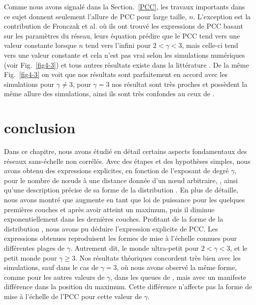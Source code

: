 Comme nous avons signalé dans la Section.~\ref{PCC}, les travaux importants \cite{Do-al2003,Cohen-Havlin2003} dans ce sujet donnent seulement l'allure de PCC pour large taille, $n$. L'exception est la contribution de Fronczak et  al. \cite{Fronczak-al2004} où ils ont trouvé les expressions de PCC basant sur les paramètres du réseau, leurs équation prédire que le PCC tend vers une valeur constante lorsque $n$ tend vers l'infini pour $2<\gamma<3$, mais celle-ci tend vers une valeur constante et cela n’est pas vrai selon les simulations numériques (voir Fig.~\ref{fig4-3}) et tous autres résultats existe dans la littérature \cite{Do-al2003,Cohen-al2002,Chung-Lu2002,Fox-Bellwood2014,Hofstad-al2014,Cohen-Havlin2003}. De la même Fig.~\ref{fig4-3} on voit que nos résultats sont parfaitement en accord avec les simulations pour $\gamma\neq3$, pour $\gamma=3$ nos résultat sont très proches et possèdent la même allure des simulations, ainsi ils sont très confondes au ceux de \cite{Fronczak-al2004}.
 
\section{conclusion} 
Dans ce chapitre, nous avons étudié en détail certains aspects fondamentaux des réseaux sans-échelle non corrélés. Avec des étapes et des hypothèses simples, nous avons obtenu des expressions explicites, en fonction de l'exposant de degré $\gamma$, pour le nombre de nœuds à une distance donnée d'un nœud arbitraire, \nl\nolinebreak, ainsi qu'une description précise de sa forme de la distribution \nolinebreak. En plus de détaille, nous avons montré que \nl augmente en tant que loi de puissance pour les quelques premières couches et après avoir atteint un maximum, puis il diminue exponentiellement dans les dernières couches.
Profitant de la forme de la distribution \nl, nous avons pu déduire l'expression explicite de PCC. Les expressions obtenues reproduisent les formes de mise à l'échelle connues pour différentes plages de $\gamma$. Autrement dit, le monde ultra-petit pour $2<\gamma<3$, et le petit monde pour $\gamma\ge 3$. Nos résultats théoriques concordent très bien avec les simulations, sauf dans le cas de $\gamma=3$, où nous avons observé la même forme, comme pour les autres valeurs de $\gamma$, dans les queues de \nl, mais avec un manifeste différence dans la position du maximum. Cette différence n'affecte pas la forme de mise à l'échelle de l'PCC pour cette valeur de $\gamma$.